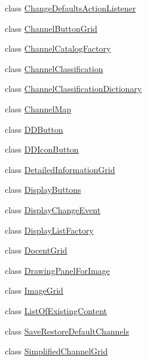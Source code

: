 \begin{DoxyCompactItemize}
\item 
class \hyperlink{classgov_1_1fnal_1_1ppd_1_1dd_1_1changer_1_1ChangeDefaultsActionListener}{Change\-Defaults\-Action\-Listener}
\item 
class \hyperlink{classgov_1_1fnal_1_1ppd_1_1dd_1_1changer_1_1ChannelButtonGrid}{Channel\-Button\-Grid}
\item 
class \hyperlink{classgov_1_1fnal_1_1ppd_1_1dd_1_1changer_1_1ChannelCatalogFactory}{Channel\-Catalog\-Factory}
\item 
class \hyperlink{classgov_1_1fnal_1_1ppd_1_1dd_1_1changer_1_1ChannelClassification}{Channel\-Classification}
\item 
class \hyperlink{classgov_1_1fnal_1_1ppd_1_1dd_1_1changer_1_1ChannelClassificationDictionary}{Channel\-Classification\-Dictionary}
\item 
class \hyperlink{classgov_1_1fnal_1_1ppd_1_1dd_1_1changer_1_1ChannelMap}{Channel\-Map}
\item 
class \hyperlink{classgov_1_1fnal_1_1ppd_1_1dd_1_1changer_1_1DDButton}{D\-D\-Button}
\item 
class \hyperlink{classgov_1_1fnal_1_1ppd_1_1dd_1_1changer_1_1DDIconButton}{D\-D\-Icon\-Button}
\item 
class \hyperlink{classgov_1_1fnal_1_1ppd_1_1dd_1_1changer_1_1DetailedInformationGrid}{Detailed\-Information\-Grid}
\item 
class \hyperlink{classgov_1_1fnal_1_1ppd_1_1dd_1_1changer_1_1DisplayButtons}{Display\-Buttons}
\item 
class \hyperlink{classgov_1_1fnal_1_1ppd_1_1dd_1_1changer_1_1DisplayChangeEvent}{Display\-Change\-Event}
\item 
class \hyperlink{classgov_1_1fnal_1_1ppd_1_1dd_1_1changer_1_1DisplayListFactory}{Display\-List\-Factory}
\item 
class \hyperlink{classgov_1_1fnal_1_1ppd_1_1dd_1_1changer_1_1DocentGrid}{Docent\-Grid}
\item 
class \hyperlink{classgov_1_1fnal_1_1ppd_1_1dd_1_1changer_1_1DrawingPanelForImage}{Drawing\-Panel\-For\-Image}
\item 
class \hyperlink{classgov_1_1fnal_1_1ppd_1_1dd_1_1changer_1_1ImageGrid}{Image\-Grid}
\item 
class \hyperlink{classgov_1_1fnal_1_1ppd_1_1dd_1_1changer_1_1ListOfExistingContent}{List\-Of\-Existing\-Content}
\item 
class \hyperlink{classgov_1_1fnal_1_1ppd_1_1dd_1_1changer_1_1SaveRestoreDefaultChannels}{Save\-Restore\-Default\-Channels}
\item 
class \hyperlink{classgov_1_1fnal_1_1ppd_1_1dd_1_1changer_1_1SimplifiedChannelGrid}{Simplified\-Channel\-Grid}
\end{DoxyCompactItemize}
